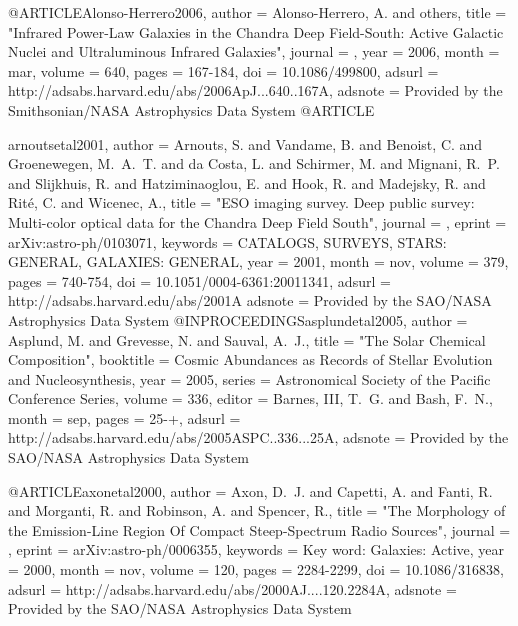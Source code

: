 {@ARTICLE{Alonso-Herrero2006,
   author = {{Alonso-Herrero}, A. and others},
    title = "{Infrared Power-Law Galaxies in the Chandra Deep Field-South: Active Galactic Nuclei and Ultraluminous Infrared Galaxies}",
  journal = {\apj},
     year = 2006,
    month = mar,
   volume = 640,
    pages = {167-184},
      doi = {10.1086/499800},
   adsurl = {http://adsabs.harvard.edu/abs/2006ApJ...640..167A},
  adsnote = {Provided by the Smithsonian/NASA Astrophysics Data System}
}
@ARTICLE{arnoutsetal2001,
   author = {{Arnouts}, S. and {Vandame}, B. and {Benoist}, C. and {Groenewegen}, M.~A.~T. and 
	{da Costa}, L. and {Schirmer}, M. and {Mignani}, R.~P. and {Slijkhuis}, R. and 
	{Hatziminaoglou}, E. and {Hook}, R. and {Madejsky}, R. and {Rit{\'e}}, C. and 
	{Wicenec}, A.},
    title = "{ESO imaging survey. Deep public survey: Multi-color optical data for the Chandra Deep Field South}",
  journal = {\aap},
   eprint = {arXiv:astro-ph/0103071},
 keywords = {CATALOGS, SURVEYS, STARS: GENERAL, GALAXIES: GENERAL},
     year = 2001,
    month = nov,
   volume = 379,
    pages = {740-754},
      doi = {10.1051/0004-6361:20011341},
   adsurl = {http://adsabs.harvard.edu/abs/2001A%
  adsnote = {Provided by the SAO/NASA Astrophysics Data System}
}
@INPROCEEDINGS{asplundetal2005,
   author = {{Asplund}, M. and {Grevesse}, N. and {Sauval}, A.~J.},
    title = "{The Solar Chemical Composition}",
booktitle = {Cosmic Abundances as Records of Stellar Evolution and Nucleosynthesis},
     year = 2005,
   series = {Astronomical Society of the Pacific Conference Series},
   volume = 336,
   editor = {{Barnes}, III, T.~G. and {Bash}, F.~N.},
    month = sep,
    pages = {25-+},
   adsurl = {http://adsabs.harvard.edu/abs/2005ASPC..336...25A},
  adsnote = {Provided by the SAO/NASA Astrophysics Data System}
}

@ARTICLE{axonetal2000,
   author = {{Axon}, D.~J. and {Capetti}, A. and {Fanti}, R. and {Morganti}, R. and 
	{Robinson}, A. and {Spencer}, R.},
    title = "{The Morphology of the Emission-Line Region Of Compact Steep-Spectrum Radio Sources}",
  journal = {\aj},
   eprint = {arXiv:astro-ph/0006355},
 keywords = {Key word: Galaxies: Active},
     year = 2000,
    month = nov,
   volume = 120,
    pages = {2284-2299},
      doi = {10.1086/316838},
   adsurl = {http://adsabs.harvard.edu/abs/2000AJ....120.2284A},
  adsnote = {Provided by the SAO/NASA Astrophysics Data System}
}

}}

